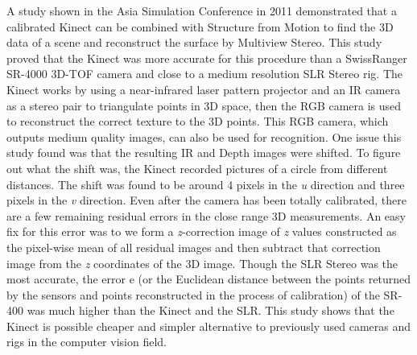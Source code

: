 \documentclass[12pt,twocolumn]{article}
\begin{document}
\indent	 A study shown in the Asia Simulation Conference in 2011 demonstrated that a calibrated Kinect can be combined with Structure from Motion to find the 3D data of a scene and reconstruct the surface by Multiview Stereo. This study proved that the Kinect was more accurate for this procedure than a SwissRanger SR-4000 3D-TOF camera and close to a medium resolution SLR Stereo rig. The Kinect works by using a near-infrared laser pattern projector and an IR camera as a stereo pair to triangulate points in 3D space, then the RGB camera is used to reconstruct the correct texture to the 3D points. This RGB camera, which outputs medium quality images, can also be used for recognition. One issue this study found was that the resulting IR and Depth images were shifted. To figure out what the shift was, the Kinect recorded pictures of a circle from different distances. The shift was found to be around 4 pixels in the \emph{u} direction and three pixels in the \emph{v} direction. Even after the camera has been totally calibrated, there are a few remaining residual errors in the close range 3D measurements. An easy fix for this error was to we form a \emph{z}-correction image of \emph{z} values constructed as the pixel-wise mean of all residual images and then subtract that correction image from the \emph{z} coordinates of the 3D image.  \cite{cite1} Though the SLR Stereo was the most accurate, the error e (or the Euclidean distance between the points returned by the sensors and points reconstructed in the process of calibration) of the SR-400 was much higher than the Kinect and the SLR. This study shows that the Kinect is possible cheaper and simpler alternative to previously used cameras and rigs in the computer vision field.\\
\end{document}
